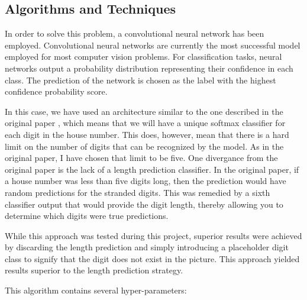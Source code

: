 \documentclass[12pt]{article}
\begin{document}
\subsection{Algorithms and Techniques} \label{sssec:algs}
In order to solve this problem, a convolutional neural network has been employed.
Convolutional neural networks are currently the most successful model employed for most computer vision problems.
For classification tasks, neural networks output a probability distribution representing their confidence in each class.
The prediction of the network is chosen as the label with the highest confidence probability score.

In this case, we have used an architecture similar to the one described in the original paper \cite{svhn_original_paper}, which means that we will have a unique softmax classifier for each digit in the house number.
This does, however, mean that there is a hard limit on the number of digits that can be recognized by the model.
As in the original paper, I have chosen that limit to be five.
One divergance from the original paper is the lack of a length prediction classifier.
In the original paper, if a house number was less than five digits long, then the prediction would have random predictions for the stranded digits.
This was remedied by a sixth classifier output that would provide the digit length, thereby allowing you to determine which digits were true predictions.

While this approach was tested during this project, superior results were achieved by discarding the length prediction and simply introducing a placeholder digit class to signify that the digit does not exist in the picture.
This approach yielded results superior to the length prediction strategy.

This algorithm contains several hyper-parameters:
\end{document}
